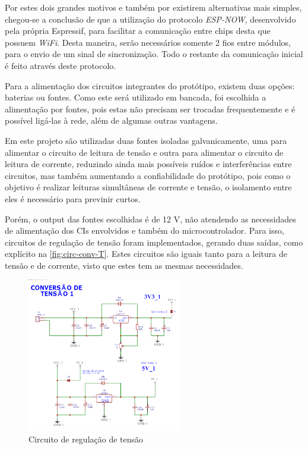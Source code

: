 Por estes dois grandes motivos e também por existirem alternativas mais simples, chegou-se a conclusão de que a utilização do protocolo \textit{ESP-NOW}, desenvolvido pela própria Espressif, para facilitar a comunicação entre chips desta que possuem \textit{WiFi}. Desta maneira, serão necessários somente 2 fios entre módulos, para o envio de um sinal de sincronização. Todo o restante da comunicação inicial é feito através deste protocolo.

Para a alimentação dos circuitos integrantes do protótipo, existem duas opções: baterias ou fontes. Como este será utilizado em bancada, foi escolhida a alimentação por fontes, pois estas não precisam ser trocadas frequentemente e é possível ligá-las à rede, além de algumas outras vantagens.

Em este projeto são utilizadas duas fontes isoladas galvanicamente, uma para alimentar o circuito de leitura de tensão e outra para alimentar o circuito de leitura de corrente, reduzindo ainda mais possíveis ruídos e interferências entre circuitos, mas também aumentando a confiabilidade do protótipo, pois como o objetivo é realizar leituras simultâneas de corrente e tensão, o isolamento entre eles é necessário para previnir curtos.

Porém, o output das fontes escolhidas é de 12 V, não atendendo as necessidades de alimentação dos \gls{CI}s envolvidos e também do microcontrolador. Para isso, circuitos de regulação de tensão foram implementados, gerando duas saídas, como explícito na \autoref{fig:circ-conv-T}. Estes circuitos são iguais tanto para a leitura de tensão e de corrente, visto que estes tem as mesmas necessidades.

\begin{figure}[htb!]
    \caption{Circuito de regulação de tensão}
    \label{fig:circ-conv-T}
    \includegraphics[width=0.6\textwidth]{figuras/circ-conv-T.png}
    \fonte{}
\end{figure}

